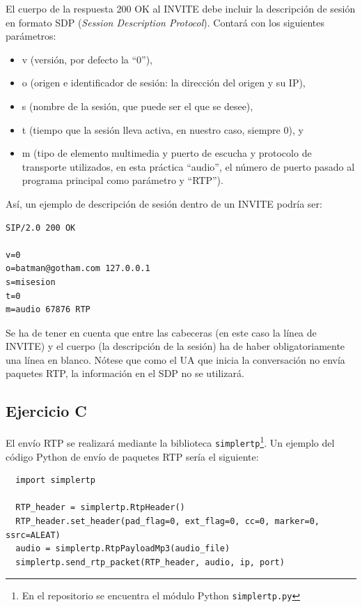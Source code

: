 \documentclass[a4paper,11pt]{article}
\begin{document}
El cuerpo de la respuesta 200 OK al INVITE debe incluir la descripción de sesión en formato SDP (\emph{Session Description Protocol}). Contará con los siguientes parámetros:

\begin{itemize}
  \item v (versión, por defecto la ``0''),
  \item o (origen e identificador de sesión: la dirección del origen y su IP),
  \item s (nombre de la sesión, que puede ser el que se desee),
  \item t (tiempo que la sesión lleva activa, en nuestro caso, siempre 0), y
  \item m (tipo de elemento multimedia y puerto de escucha y protocolo de transporte utilizados, en esta práctica ``audio'', el número de puerto pasado al programa principal como parámetro y ``RTP'').
\end{itemize}

Así, un ejemplo de descripción de sesión dentro de un INVITE podría ser:

\begin{verbatim}
SIP/2.0 200 OK

v=0
o=batman@gotham.com 127.0.0.1
s=misesion
t=0
m=audio 67876 RTP
\end{verbatim}

Se ha de tener en cuenta que entre las cabeceras (en este caso la línea de INVITE) y el cuerpo (la descripción de la sesión) ha de haber obligatoriamente una línea en blanco. Nótese que como el UA que inicia la conversación no envía paquetes RTP, la información en el SDP no se utilizará.


\subsection*{Ejercicio C}

El envío RTP se realizará mediante la biblioteca \texttt{simplertp}\footnote{En el repositorio se encuentra el módulo Python \texttt{simplertp.py}}. Un ejemplo del código Python de envío de paquetes RTP sería el siguiente:

\begin{verbatim}
  import simplertp

  RTP_header = simplertp.RtpHeader()
  RTP_header.set_header(pad_flag=0, ext_flag=0, cc=0, marker=0, ssrc=ALEAT)
  audio = simplertp.RtpPayloadMp3(audio_file)
  simplertp.send_rtp_packet(RTP_header, audio, ip, port)
\end{verbatim}
\end{document}
